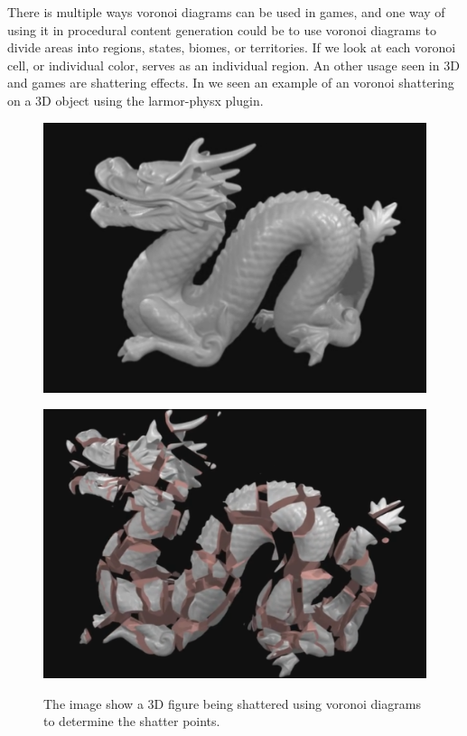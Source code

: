 There is multiple ways voronoi diagrams can be used in games, and one way of using it in procedural content generation could be to use voronoi diagrams to divide areas into regions, states, biomes, or territories. If we look at  each voronoi cell, or individual color, serves as an individual region. An other usage seen in 3D and games are shattering effects. In  we seen an example of an voronoi shattering on a 3D object using the larmor-physx\cite{larmor-physx} plugin.

\begin{figure}[H]
	\begin{minipage}[b]{.49\linewidth}
		\includegraphics[width=0.95\linewidth]{img/VoronoiShatter1}
		\label{fig:3a}
	\end{minipage}
	\begin{minipage}[b]{.49\linewidth}
		\includegraphics[width=0.95\linewidth]{img/VoronoiShatter2}
		\label{fig:3b}
	\end{minipage}
	\centering
	\caption{The image show a 3D figure being shattered using voronoi diagrams to determine the shatter points.}
	\label{fig:VoronoiShatering}
\end{figure}

